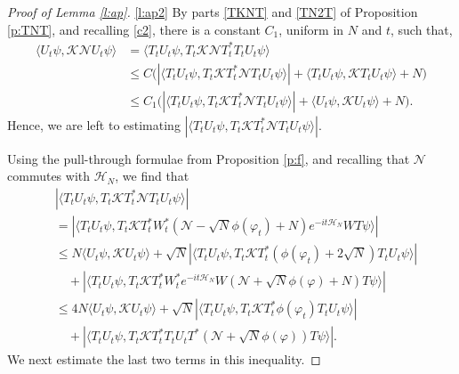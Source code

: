 \documentclass[11pt,a4paper]{scrartcl}
\newcommand{\N}{\mathcal{N}}
\newcommand{\K}{\mathcal{K}}
\begin{document}
\begin{proof}[Proof of Lemma \ref{l:ap}]
  \ref{l:ap2} By parts \eqref{TKNT} and \eqref{TN2T} of Proposition
  \ref{p:TNT}, and recalling \eqref{c2}, there is a constant $C_1$, uniform in
  $N$ and $t$, such that,
  \begin{equation}
    \label{nk1}
    \begin{split}
      \langle U_t \psi, \K \N U_t \psi \rangle & = \langle T_t U_t \psi, T_t
      \K \N T_t^* T_t U_t \psi \rangle \\
      & \le C \big( | \langle T_t U_t \psi, T_t \K T_t^* \N T_t U_t \psi \rangle
      | + \langle T_t U_t \psi, \K T_t U_t \psi \rangle + N \big) \\
      & \le C_1 \big( | \langle T_t U_t \psi, T_t \K T_t^* \N T_t U_t \psi
      \rangle | + \langle U_t \psi, \K U_t \psi \rangle + N \big).
    \end{split}
  \end{equation}
  Hence, we are left to estimating $| \langle T_t U_t \psi, T_t \K T_t^* \N
  T_t U_t \psi \rangle |$.


  Using the pull-through formulae from Proposition \ref{p:f}, and
  recalling that $\N$ commutes with $\mathcal{H}_N$, we find that
  \begin{equation}
    \label{nk2}
    \begin{split}
      & | \langle T_t U_t \psi, T_t \K T_t^* \N T_t U_t \psi \rangle | \\
      & = | \langle T_t U_t \psi, T_t \K T_t^* W_t^* (\N - \sqrt{N}
      \phi(\varphi_t) + N) e^{-it \mathcal{H}_N} WT \psi \rangle | \\
      & \le N \langle U_t \psi, \K U_t \psi \rangle + \sqrt{N} | \langle T_t
      U_t \psi, T_t \K T_t^* ( \phi(\varphi_t) + 2 \sqrt{N} ) T_t U_t \psi
      \rangle | \\
      & \quad + | \langle T_t U_t \psi, T_t \K T_t^* W_t^* e^{-it
      \mathcal{H}_N} W (\N + \sqrt{N} \phi(\varphi) + N) T \psi \rangle | \\
      & \le 4 N \langle U_t \psi, \K U_t \psi \rangle + \sqrt{N} | \langle T_t
      U_t \psi, T_t \K T_t^* \phi(\varphi_t) T_t U_t \psi \rangle | \\
      & \quad + | \langle T_t U_t \psi, T_t \K T_t^* T_t U_t T^* (\N +
      \sqrt{N} \phi(\varphi) ) T \psi \rangle|.
    \end{split}
  \end{equation}
  We next estimate the last two terms in this inequality.



\end{proof}
\end{document}
